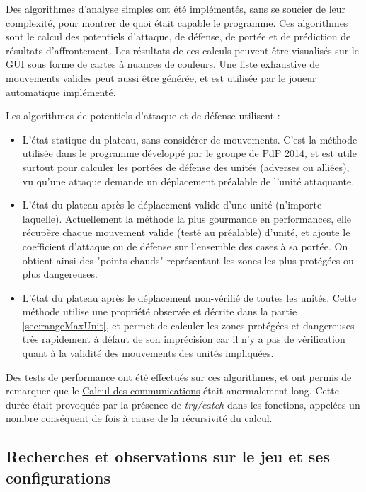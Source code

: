 \documentclass[a4paper]{report}
\begin{document}
Des algorithmes d'analyse simples ont été implémentés, sans se soucier de leur complexité, pour montrer de quoi était capable le programme.
Ces algorithmes sont le calcul des potentiels d'attaque, de défense, de portée et de prédiction de résultats d'affrontement. Les résultats de ces calculs peuvent être visualisés sur le GUI sous forme de cartes à nuances de couleurs. Une liste exhaustive de mouvements valides peut aussi être générée, et est utilisée par le joueur automatique implémenté.

Les algorithmes de potentiels d'attaque et de défense utilisent :
\begin{itemize}
\item L'état statique du plateau, sans considérer de mouvements. C'est la méthode utilisée dans le programme développé par le groupe de PdP 2014, et est utile surtout pour calculer les portées de défense des unités (adverses ou alliées), vu qu'une attaque demande un déplacement préalable de l'unité attaquante.
\item L'état du plateau après le déplacement valide d'une unité (n'importe laquelle). Actuellement la méthode la plus gourmande en performances, elle récupère chaque mouvement valide (testé au préalable) d'unité, et ajoute le coefficient d'attaque ou de défense sur l'ensemble des cases à sa portée. On obtient ainsi des "points chauds" représentant les zones les plus protégées ou plus dangereuses.
\item L'état du plateau après le déplacement non-vérifié de toutes les unités. Cette méthode utilise une propriété observée et décrite dans la partie \ref{sec:rangeMaxUnit}, et permet de calculer les zones protégées et dangereuses très rapidement à défaut de son imprécision car il n'y a pas de vérification quant à la validité des mouvements des unités impliquées.
\end{itemize}

Des tests de performance ont été effectués sur ces algorithmes, et ont permis de remarquer que le \href{calculComs}{Calcul des communications} était anormalement long. Cette durée était provoquée par la présence de \textit{try/catch} dans les fonctions, appelées un nombre conséquent de fois à cause de la récursivité du calcul.

\subsection{Recherches et observations sur le jeu et ses configurations}
\label{sec:analyseEtoile}
\end{document}
